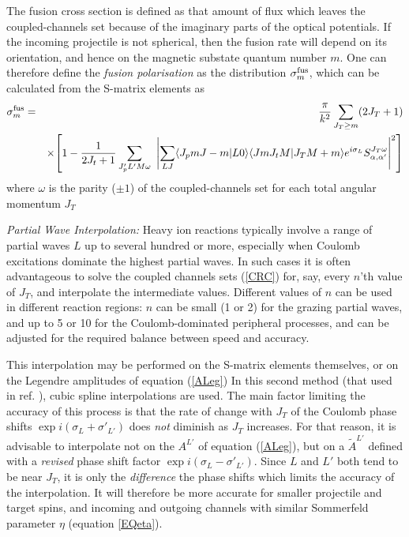 \documentclass[11pt,a4paper]{article}
\begin{document}
The fusion cross section is defined as that amount of flux which leaves
the coupled-channels set because of the imaginary parts of the optical
potentials. If the incoming projectile is not spherical, then
the fusion rate will depend on its orientation, and hence on the magnetic
substate quantum number $m$.  One can therefore define the
{\em fusion polarisation} as the distribution
$ \sigma^{\rm fus}_m $, which can be calculated from the S-matrix
elements as
\begin{eqnarray} \nonumber
  \sigma^{\rm fus}_m  &=& {\pi \over k^2}
     \sum_{J_T \geq m} (2J_T + 1)  \\
 &&\times { \left [ 1 - {1 \over 2J_t + 1}
     \sum_{J'_ p L' M \omega} ~
  \left | \sum _ {LJ}
   \langle J_p m J - m | L 0\rangle
   \langle J m J_t M | J_T M + m\rangle
    e^{i \sigma_L} S^{J_T \omega}_{\alpha ,\alpha'}
  \right | ^ 2  \right ] }
\end{eqnarray}
where $\omega$ is the parity ($\pm 1$) of the coupled-channels set for each
total angular momentum $J_T$

{\em Partial Wave Interpolation:}
Heavy ion reactions typically involve a range of partial waves $L$ up to
several hundred or more, especially when Coulomb excitations dominate the
highest partial waves.  In such cases it is often advantageous to solve
the coupled channels sets (\ref{CRC}) for, say, every $n$'th value of
$J_T$, and interpolate the intermediate values.  Different values
of $n$ can be used in different reaction regions: $n$ can be small (1 or
2) for the grazing partial waves, and up to 5 or 10 for the
Coulomb-dominated peripheral processes, and can be adjusted for
the required balance between speed and accuracy.

This interpolation may be performed on the S-matrix elements themselves,
or on the Legendre amplitudes of equation (\ref{ALeg})
In this second method (that used in ref. \cite{FRESCO}),
cubic spline interpolations
are used. The main factor limiting the accuracy of this process is
that the rate of change with $J_T$ of the Coulomb phase shifts
$\exp i(\sigma_L + \sigma'_ {L'})$ does {\em not}
diminish as $J_T$ increases.  For that reason, it is advisable to
interpolate not on the $A^{L'} $ of equation (\ref{ALeg}), but on
a $\tilde A^{L'}$ defined with a {\em revised} phase shift factor
$\exp i(\sigma_L - \sigma'_ {L'}) .$  Since $L$ and $L'$ both tend to be near $J_T$, it is only the
{\em difference} the phase shifts which limits the accuracy of the
interpolation. It will therefore be more accurate for smaller projectile
and target spins, and incoming and outgoing channels with similar
Sommerfeld parameter $\eta$ (equation \ref{EQeta}).
\end{document}
